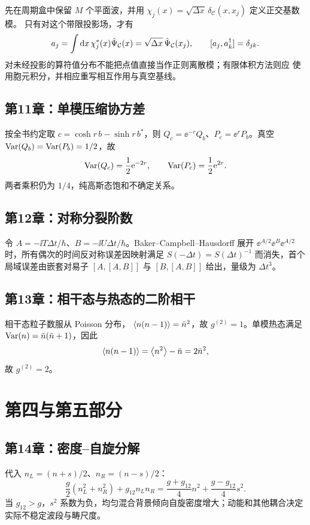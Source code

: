 先在周期盒中保留 $M$ 个平面波，并用
$\chi_j(x)=\sqrt{\Delta x}\,\delta_{\mathcal C}(x,x_j)$ 定义正交基数模。
只有对这个带限投影场，才有
\[
  a_j=\int\mathop{}\!\mathrm{d} x\,\chi_j^*(x)\hat{\Psi}_{\mathcal C}(x)
  =\sqrt{\Delta x}\,\hat{\Psi}_{\mathcal C}(x_j),
  \qquad [a_j,a_k^\dagger]=\delta_{jk}.
\]
对未经投影的算符值分布不能把点值直接当作正则离散模；有限体积方法则应
使用胞元积分，并相应重写相互作用与真空基线。

\subsection*{第11章：单模压缩协方差}

按全书约定取
$c=\cosh r\,b-\sinh r\,b^*$，则
$Q_c=\ee^{-r}Q_b$、$P_c=\ee^rP_b$。真空
$\operatorname{Var}(Q_b)=\operatorname{Var}(P_b)=1/2$，故
\[
  \operatorname{Var}(Q_c)=\frac12\mathrm{e}^{-2r},
  \qquad
  \operatorname{Var}(P_c)=\frac12\mathrm{e}^{2r}.
\]
两者乘积仍为 $1/4$，纯高斯态饱和不确定关系。

\subsection*{第12章：对称分裂阶数}

令 $A=-\ii T\Delta t/\hbar$、$B=-\ii U\Delta t/\hbar$。Baker--Campbell--Hausdorff 展开
$\ee^{A/2}\ee^B\ee^{A/2}$ 时，所有偶次的时间反对称误差因映射满足
$S(-\Delta t)=S(\Delta t)^{-1}$ 而消失，首个局域误差由嵌套对易子
$[A,[A,B]]$ 与 $[B,[A,B]]$ 给出，量级为 $\Delta t^3$。

\subsection*{第13章：相干态与热态的二阶相干}

相干态粒子数服从 Poisson 分布，
$\left\langle n(n-1)\right\rangle=\bar n^2$，故 $g^{(2)}=1$。单模热态满足
$\operatorname{Var}(n)=\bar n(\bar n+1)$，因此
\[
  \left\langle n(n-1)\right\rangle=\left\langle n^2\right\rangle-\bar n
  =2\bar n^2,
\]
故 $g^{(2)}=2$。

\section{第四与第五部分}

\subsection*{第14章：密度--自旋分解}

代入 $n_L=(n+s)/2$、$n_R=(n-s)/2$：
\[
  \frac g2(n_L^2+n_R^2)+g_{12}n_Ln_R
  =\frac{g+g_{12}}4n^2+\frac{g-g_{12}}4s^2.
\]
当 $g_{12}>g$，$s^2$ 系数为负，均匀混合背景倾向自旋密度增大；动能和其他耦合决定实际不稳定波段与畴尺度。

